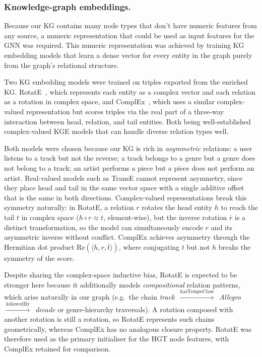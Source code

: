 \subsubsection{Knowledge-graph embeddings.}

Because our KG contains many node types that don't have numeric features from any source, a numeric representation that could be used as input features for the GNN was required. This numeric representation was achieved by training  KG embedding models that learn a dense vector for every entity in the graph purely from the graph's relational structure.

Two KG embedding models were trained on triples exported from the enriched KG. RotatE~\cite{sun2019rotate}, which represents each entity as a complex vector and each relation as a rotation in complex space, and ComplEx~\cite{trouillon2016complex}, which uses a similar complex-valued representation but scores triples via the real part of a three-way interaction between head, relation, and tail entities. Both being well-established complex-valued KGE models that can handle diverse relation types well.

Both models were chosen because our KG is rich in \emph{asymmetric} relations: a user listens to a track but not the reverse; a track belongs to a genre but a genre does not belong to a track; an artist performs a piece but a piece does not perform an artist. Real-valued models such as TransE cannot represent asymmetry, since they place head and tail in the same vector space with a single additive offset that is the same in both directions. Complex-valued representations break this symmetry naturally: in RotatE, a relation $r$ rotates the head entity $h$ to reach the tail $t$ in complex space ($h \circ r \approx t$, element-wise), but the inverse rotation $\bar{r}$ is a distinct transformation, so the model can simultaneously encode $r$ and its asymmetric inverse without conflict. ComplEx achieves asymmetry through the Hermitian dot product $\mathrm{Re}(\langle h, r, \bar{t}\rangle)$, where conjugating $t$ but not $h$ breaks the symmetry of the score.

Despite sharing the complex-space inductive bias, RotatE is expected to be stronger here because it additionally models \emph{compositional} relation patterns, which arise naturally in our graph (e.g.\ the chain \textit{track~$\xrightarrow{\text{hasTempoClass}}$~Allegro~$\xrightarrow{\text{followedBy}}$~decade} or genre-hierarchy traversals). A rotation composed with another rotation is still a rotation, so RotatE represents such chains geometrically, whereas ComplEx has no analogous closure property. RotatE was therefore used as the primary initialiser for the HGT node features, with ComplEx retained for comparison.

